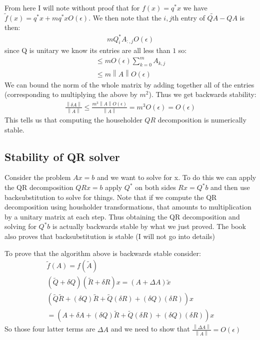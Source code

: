 \documentclass[12pt]{article}
\newcommand{\norm}[1]{\left\lVert#1\right\rVert}
\begin{document}
From here I will note without proof that for $f(x)=q^*x$ we have $\tilde f(x)=q^*x+m q^*x O(\epsilon)$. We then note that the $i,j$th entry of $\tilde{QA}-QA$ is then:
\begin{align}
	mQ_{i}^*A_{:,j}O(\epsilon)
\end{align}
since Q is unitary we know its entries are all less than $1$ so:
\begin{align}
	\leq mO(\epsilon)\sum_{k=0}^mA_{k,j} \\
	\leq m\norm{A}O(\epsilon)
\end{align}
We can bound the norm of the whole matrix by adding together all of the entries (corresponding to multiplying the above by $m^2$). Thus we get backwards stability:
\begin{align}
	\frac{\norm{\delta A}}{\norm{A}}\leq \frac{m^3\norm{A}O(\epsilon)}{\norm{A}}=m^3O(\epsilon)=O(\epsilon)
\end{align}
This tells us that computing the householder $QR$ decomposition is numerically stable.

\subsection{Stability of QR solver}
Consider the problem $Ax=b$ and we want to solve for x. To do this we can apply the QR decomposition $QRx=b$ apply $Q^*$ on both sides $Rx=Q^*b$ and then use backsubstitution to solve for things.
Note that if we compute the QR decomposition using housholder transformations, that amounts to multiplication by a unitary matrix at each step. Thus obtaining the QR decomposition and solving for $Q^*b$ is actually backwards stable by what we just proved. The book also proves that backsubstitution is stable (I will not go into details)

To prove that the algorithm above is backwards stable consider:
\begin{align}
	\tilde f(A)=f(\tilde A)                                                         \\
	(\tilde Q+\delta Q)(\tilde R+\delta R)x=(A+\Delta A)\tilde x                    \\
	(\tilde Q\tilde R +(\delta Q)\tilde R+\tilde Q(\delta R)+(\delta Q)(\delta R))x \\
	=(A+\delta A+(\delta Q)\tilde R+\tilde Q(\delta R)+(\delta Q)(\delta R))x
\end{align}
So those four latter terms are $\Delta A$ and we need to show that $\frac{\norm{\Delta A}}{\norm A}=O(\epsilon)$
\end{document}
